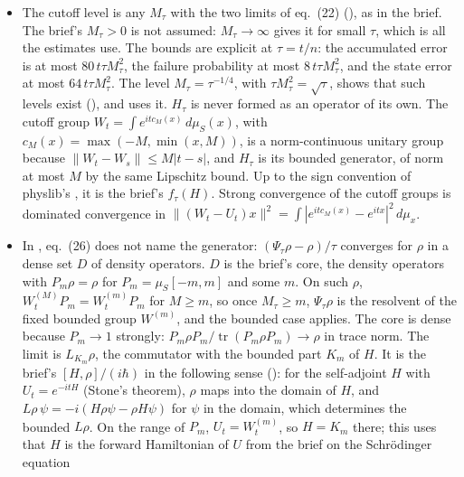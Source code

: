 \documentclass[11pt]{article}
\begin{document}
\begin{itemize}
  eq.~(14) on pure states with constant $80$. It extends to all density operators by summing the
  canonical expansion in $\mathcal{S}_1$. For $8\|K\|^2\tau^2 > \frac12$ the bound is trivial,
  since $\|\Psi_\tau\rho - T_\tau\rho\|_1 \le 2$, so eq.~(14) holds for every $\tau \ge 0$.
\item The cutoff level is any $M_\tau$ with the two limits of eq.~(22)
  (), as in the brief. The brief's $M_\tau > 0$ is not assumed: $M_\tau \to
  \infty$ gives it for small $\tau$, which is all the estimates use. The bounds are explicit at
  $\tau = t/n$: the accumulated error is at most $80\,t\tau M_\tau^2$, the failure probability
  at most $8\,t\tau M_\tau^2$, and the state error at most $64\,t\tau M_\tau^2$. The level
  $M_\tau = \tau^{-1/4}$, with $\tau M_\tau^2 = \sqrt\tau$, shows that such levels exist
  (), and  uses it.
  $H_\tau$ is never formed as an operator of its own. The cutoff group
  $W_t = \int e^{itc_M(x)}\,d\mu_S(x)$, with $c_M(x) = \max(-M,\min(x,M))$, is a norm-continuous
  unitary group because $\|W_t - W_s\| \le M|t-s|$, and $H_\tau$ is its bounded generator, of norm
  at most $M$ by the same Lipschitz bound. Up to the sign convention of physlib's
  , it is the brief's $f_\tau(H)$. Strong convergence of the cutoff
  groups is dominated convergence in
  $\|(W_t - U_t)x\|^2 = \int |e^{itc_M(x)} - e^{itx}|^2\,d\mu_x$.
\item In , eq.~(26) does not name the generator: $(\Psi_\tau\rho -
  \rho)/\tau$ converges for $\rho$ in a dense set $D$ of density operators. $D$ is the brief's
  core, the density operators with $P_m\rho = \rho$ for $P_m = \mu_S[-m,m]$ and some $m$. On
  such $\rho$,
  $W^{(M)}_tP_m = W^{(m)}_tP_m$ for $M \ge m$, so once $M_\tau \ge m$, $\Psi_\tau\rho$ is the
  resolvent of the fixed bounded group $W^{(m)}$, and the bounded case applies. The core is dense
  because $P_m \to 1$ strongly: $P_m\rho P_m/\operatorname{tr}(P_m\rho P_m) \to \rho$ in trace norm.
  The limit is $L_{K_m}\rho$, the commutator with the bounded part $K_m$ of $H$. It is the
  brief's $[H,\rho]/(i\hbar)$ in the following sense (): for the
  self-adjoint $H$ with $U_t = e^{-itH}$ (Stone's theorem), $\rho$ maps into the domain of $H$,
  and $L\rho\,\psi = -i(H\rho\psi - \rho H\psi)$ for $\psi$ in the domain, which determines the
  bounded $L\rho$. On the range of $P_m$, $U_t = W^{(m)}_t$, so $H = K_m$ there; this uses that
  $H$ is the forward Hamiltonian of $U$ from the brief on the Schr\"odinger equation

\end{itemize}
\end{document}

